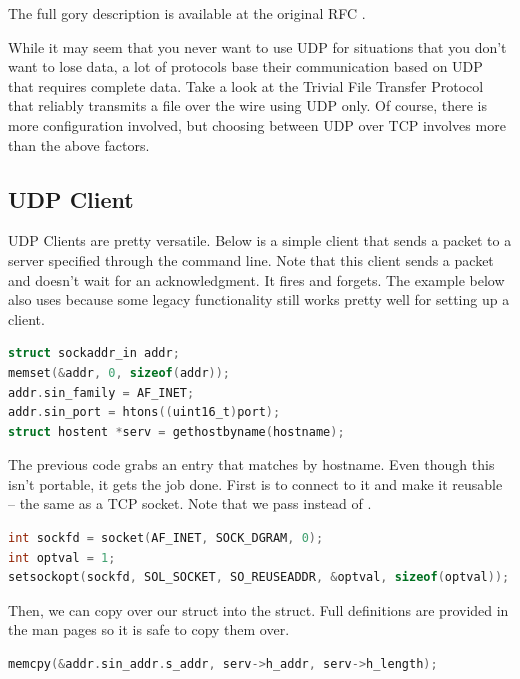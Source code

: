 The full gory description is available at the original RFC \cite{rfc768}.

While it may seem that you never want to use UDP for situations that you don't want to lose data, a lot of protocols base their communication based on UDP that requires complete data.
Take a look at the Trivial File Transfer Protocol that reliably transmits a file over the wire using UDP only.
Of course, there is more configuration involved, but choosing between UDP over TCP involves more than the above factors.

\subsection{UDP Client}

UDP Clients are pretty versatile. Below is a simple client that sends a packet to a server specified through the command line.
Note that this client sends a packet and doesn't wait for an acknowledgment.
It fires and forgets.
The example below also uses  because some legacy functionality still works pretty well for setting up a client.

\begin{lstlisting}[language=C]
struct sockaddr_in addr;
memset(&addr, 0, sizeof(addr));
addr.sin_family = AF_INET;
addr.sin_port = htons((uint16_t)port);
struct hostent *serv = gethostbyname(hostname);
\end{lstlisting}

The previous code grabs an entry  that matches by hostname.
Even though this isn't portable, it gets the job done.
First is to connect to it and make it reusable -- the same as a TCP socket.
Note that we pass  instead of .

\begin{lstlisting}[language=C]
int sockfd = socket(AF_INET, SOCK_DGRAM, 0);
int optval = 1;
setsockopt(sockfd, SOL_SOCKET, SO_REUSEADDR, &optval, sizeof(optval));
\end{lstlisting}

Then, we can copy over our  struct into the  struct.
Full definitions are provided in the man pages so it is safe to copy them over.

\begin{lstlisting}[language=C]
memcpy(&addr.sin_addr.s_addr, serv->h_addr, serv->h_length);
\end{lstlisting}

